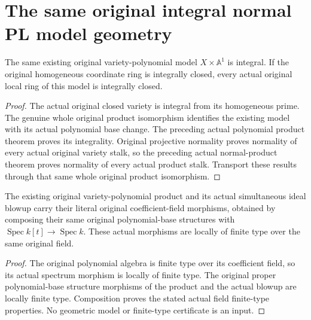 \section{The same original integral normal PL model geometry}

\begin{theorem}
\label{thm:actual-original-pl-variety-product-normal}
\leanok
{}
The same existing original variety-polynomial model $X\times\mathbb A^1$
is integral. If the original homogeneous coordinate ring is integrally
closed, every actual original local ring of this model is integrally closed.
\end{theorem}
\begin{proof}
The actual original closed variety is integral from its homogeneous prime.
The genuine whole original product isomorphism identifies the existing model
with its actual polynomial base change. The preceding actual polynomial
product theorem proves its integrality. Original projective normality proves
normality of every actual original variety stalk, so the preceding actual
normal-product theorem proves normality of every actual product stalk.
Transport these results through that same whole original product isomorphism.
\end{proof}

\begin{definition}
\label{def:actual-original-pl-product-field-structure}
\leanok
{}
The existing original variety-polynomial product and its actual simultaneous
ideal blowup carry their literal original coefficient-field morphisms, obtained
by composing their same original polynomial-base structures with
$\operatorname{Spec}k[t]\to\operatorname{Spec}k$. These actual morphisms are
locally of finite type over the same original field.
\end{definition}
\begin{proof}
The original polynomial algebra is finite type over its coefficient field, so
its actual spectrum morphism is locally of finite type. The original proper
polynomial-base structure morphisms of the product and the actual blowup are
locally finite type. Composition proves the stated actual field finite-type
properties. No geometric model or finite-type certificate is an input.
\end{proof}


